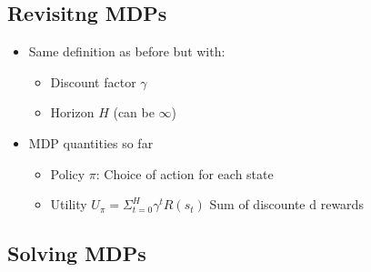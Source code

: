 \documentclass[11pt]{article}
\begin{document}
\subsection{Revisitng MDPs}
\label{sec:org74fec8a}
\begin{itemize}
\item Same definition as before but with:
\begin{itemize}
\item Discount factor \(\gamma\)
\item Horizon \(H\) (can be \(\infty\))
\end{itemize}
\item MDP quantities so far
\begin{itemize}
\item Policy \(\pi\): Choice of action for each state
\item Utility \(U_\pi=\Sigma^H_{t=0}\gamma^tR(s_t)\) Sum of discounte d rewards
\end{itemize}
\end{itemize}
\subsection{Solving MDPs}
\label{sec:org8a0fec3}
\end{document}
